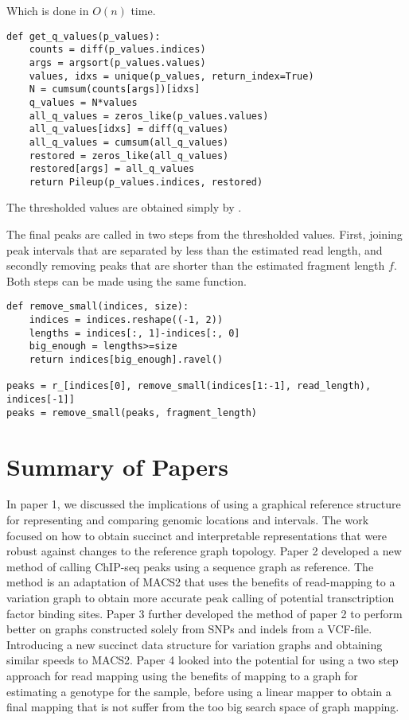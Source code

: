Which is done in $O(n)$ time.
\begin{lstlisting}
def get_q_values(p_values):
    counts = diff(p_values.indices)
    args = argsort(p_values.values)
    values, idxs = unique(p_values, return_index=True)
    N = cumsum(counts[args])[idxs]
    q_values = N*values
    all_q_values = zeros_like(p_values.values)
    all_q_values[idxs] = diff(q_values)
    all_q_values = cumsum(all_q_values)
    restored = zeros_like(all_q_values)
    restored[args] = all_q_values
    return Pileup(p_values.indices, restored)
  \end{lstlisting}
  The thresholded values are obtained simply by .

The final peaks are called in two steps from the thresholded values. First, joining peak intervals that are separated by less than the estimated read length, and secondly removing peaks that are shorter than the estimated fragment length $f$. Both steps can be made using the same function.
\begin{lstlisting}
def remove_small(indices, size):
    indices = indices.reshape((-1, 2))
    lengths = indices[:, 1]-indices[:, 0]
    big_enough = lengths>=size
    return indices[big_enough].ravel()

peaks = r_[indices[0], remove_small(indices[1:-1], read_length), indices[-1]]
peaks = remove_small(peaks, fragment_length)
\end{lstlisting}


\chapter{Summary of Papers}
In paper 1, we discussed the implications of using a graphical reference structure for representing and comparing genomic locations and intervals.
The work focused on how to obtain succinct and interpretable representations that were robust against changes to the reference graph topology. 
Paper 2 developed a new method of calling ChIP-seq peaks using a sequence graph as reference.
The method is an adaptation of MACS2 that uses the benefits of read-mapping to a variation graph to obtain more accurate peak calling of potential transctription factor binding sites. 
Paper 3 further developed the method of paper 2 to perform better on graphs constructed solely from SNPs and indels from a VCF-file. Introducing a new succinct data structure for variation graphs and obtaining similar speeds to MACS2.
Paper 4 looked into the potential for using a two step approach for read mapping using the benefits of mapping to a graph for estimating a genotype for the sample, before using a linear mapper to obtain a final mapping that is not suffer from the too big search space of graph mapping. 


